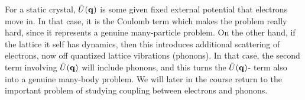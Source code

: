 \noindent For a static crystal, $\tilde{U}(\vb{q})$ is some given fixed external potential that electrons move in. In that case, it is the Coulomb term which makes the problem really hard, since it represents a genuine many-particle problem. On the other hand, if the lattice it self has dynamics, then this introduces additional scattering of electrons, now off quantized lattice vibrations (phonons). In that case, the second term involving $\tilde{U}(\vb{q})$ will include phonons, and this turns the $\tilde{U}(\vb{q})$- term also into a genuine many-body problem. We will later in the course return to the important problem of studying coupling between electrons and phonons.\newline
